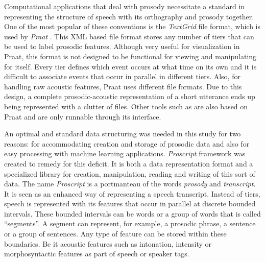 Computational applications that deal with prosody necessitate a standard in representing the structure of speech with its orthography and prosody together. One of the most popular of these conventions is the \textit{TextGrid} file format, which is used by \textit{Praat} \citep{boersma01}. This XML based file format stores any number of tiers that can be used to label prosodic features. Although very useful for visualization in Praat, this format is not designed to be functional for viewing and manipulating for itself. Every tier defines which event occurs at what time on its own and it is difficult to associate events that occur in parallel in different tiers. Also, for handling raw acoustic features, Praat uses different file formats. Due to this design, a complete prosodic-acoustic representation of a short utterance ends up being represented with a clutter of files. Other tools such as \cite{L06-1340, ProsodyPro} are also based on Praat and are only runnable through its interface. 

An optimal and standard data structuring was needed in this study for two reasons: for accommodating creation and storage of prosodic data and also for easy processing with machine learning applications. \textit{Proscript} framework was created to remedy for this deficit. It is both a data representation format and a specialized library for creation, manipulation, reading and writing of this sort of data. The name \textit{Proscript} is a portmanteau of the words \textit{prosody} and \textit{transcript}. It is seen as an enhanced way of representing a speech transcript. Instead of tiers, speech is represented with its features that occur in parallel at discrete bounded intervals. These bounded intervals can be words or a group of words that is called ``segments''. A segment can represent, for example, a prosodic phrase, a sentence or a group of sentences. Any type of feature can be stored within these boundaries. Be it acoustic features such as intonation, intensity or morphosyntactic features as part of speech or speaker tags. 

